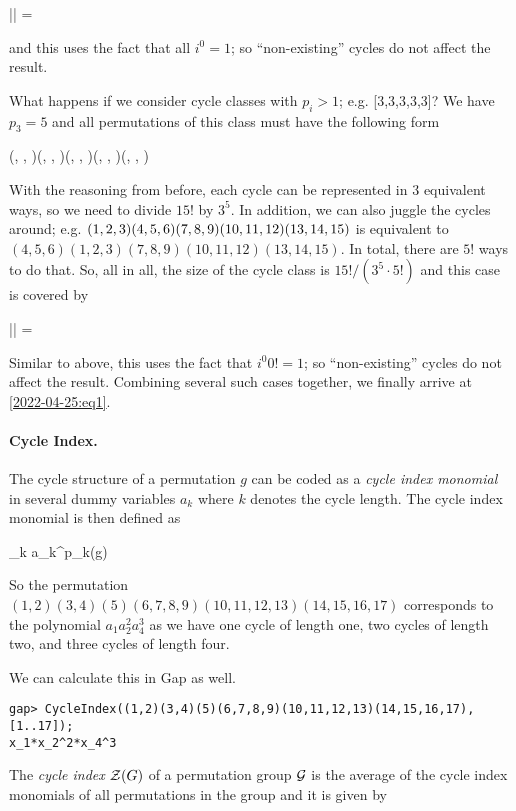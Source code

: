 \bee
|\Cc| = 
\eee

and this uses the fact that all $i^0 = 1$; so ``non-existing'' cycles do not affect the result.

What happens if we consider cycle classes with $p_i > 1$; e.g. [3,3,3,3,3]? We have $p_3=5$ and all permutations of this class must have the following form

\bee
(\cdot, \cdot, \cdot)(\cdot, \cdot, \cdot)(\cdot, \cdot, \cdot)(\cdot, \cdot, \cdot)(\cdot, \cdot, \cdot)
\eee

With the reasoning from before, each cycle can be represented in $3$ equivalent ways, so we need to divide $15!$ by $3^5$. In addition, we can also juggle the cycles around; e.g. $(1,2,3)(4,5,6)(7,8,9)\\(10,11,12)(13,14,15)$ is equivalent to $(4,5,6)(1,2,3)(7,8,9)(10,11,12)(13,14,15)$. In total, there are $5!$ ways to do that. So, all in all, the size of the cycle class is $15!/(3^5 \cdot 5!)$ and this case is covered by

\bee
|\Cc| = 
\eee

Similar to above, this uses the fact that $i^0 0! = 1$; so ``non-existing'' cycles do not affect the result. Combining several such cases together, we finally arrive at \eqref{2022-04-25:eq1}.


\paragraph{Cycle Index.} The cycle structure of a permutation $g$ can be coded as a \emph{cycle index monomial} in several dummy variables $a_k$ where $k$ denotes the cycle length. The cycle index monomial is then defined as

\bee
\prod_k a_k^{p_k(g)}
\eee

So the permutation $(1,2)(3,4)(5)(6,7,8,9)(10,11,12,13)(14,15,16,17)$ corresponds to the polynomial $a_1 a_2^2 a_4^3$ as we have one cycle of length one, two cycles of length two, and three cycles of length four.

We can calculate this in Gap as well.

\begin{verbatim}
gap> CycleIndex((1,2)(3,4)(5)(6,7,8,9)(10,11,12,13)(14,15,16,17),[1..17]);
x_1*x_2^2*x_4^3
\end{verbatim}

The \emph{cycle index} $\mathcal{Z}(G)$ of a permutation group $\mathcal{G}$ is the average of the cycle index monomials of all permutations in the group and it is given by

